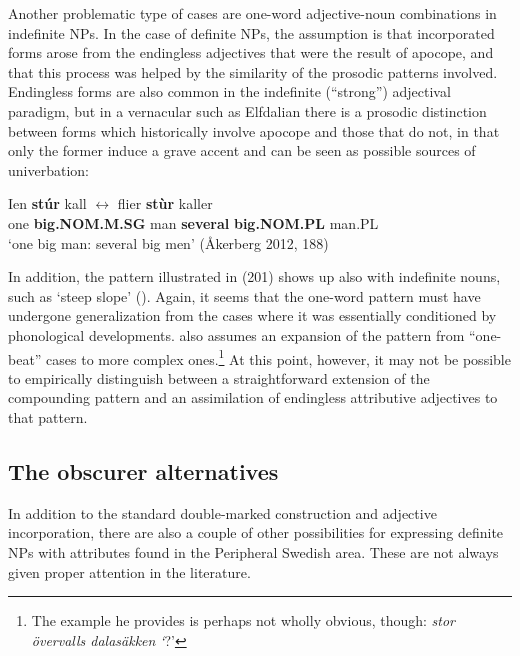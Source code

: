 
Another problematic type of cases are one-word adjective-noun combinations in indefinite NPs. In the case of definite NPs, the assumption is that incorporated forms arose from the endingless adjectives that were the result of apocope, and that this process was helped by the similarity of the prosodic patterns involved. Endingless forms are also common in the indefinite (“strong”) adjectival paradigm, but in a vernacular such as Elfdalian there is a prosodic distinction between forms which historically involve apocope and those that do not, in that only the former induce a grave accent and can be seen as possible sources of univerbation:


\ea\label{}
\gll Ien  \textbf{stúr} kall   \textbf{$\leftrightarrow $} flier\textbf{  stùr} kaller\\
one  \textbf{big.NOM.M.SG} man   \textbf{several} \textbf{big.NOM.PL} man.PL\\
\glt ‘one big man: several big men’ (Åkerberg 2012, 188)
\z

In addition, the pattern illustrated in (201) shows up also with indefinite nouns, such as  ‘steep slope’ (\citet[52]{Levander1909}). Again, it seems that the one-word pattern must have undergone generalization from the cases where it was essentially conditioned by phonological developments. \citet[103]{Dahlstedt1962} also assumes an expansion of the pattern from “one-beat” cases to more complex ones.\footnote{ The example he provides is perhaps not wholly obvious, though: \textit{stor övervalls dalasäkken }\textit{‘}?’} At this point, however, it may not be possible to empirically distinguish between a straightforward extension of the compounding pattern and an assimilation of endingless attributive adjectives to that pattern. 


\subsection{The obscurer alternatives}
\label{bkm:Ref105224927}
In addition to the standard double-marked construction and adjective incorporation, there are also a couple of other possibilities for expressing definite NPs with attributes found in the Peripheral Swedish area. These are not always given proper attention in the literature. 

